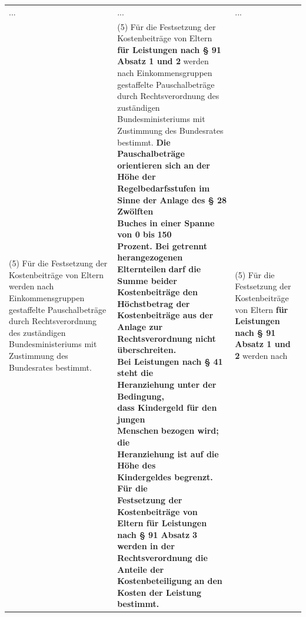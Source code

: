 \documentclass[10pt,a4paper,landscape]{article}
\begin{document}
\begin{longtable}{|L{8.2cm}|L{8.2cm}|L{8.2cm}|}
\hhline{|---|}
... & ... & ... \\
\hhline{|---|}
(5) Für die Festsetzung der Kostenbeiträge  \newline von Eltern werden nach  \newline Einkommensgruppen gestaffelte  \newline Pauschalbeträge durch Rechtsverordnung  \newline des zuständigen Bundesministeriums mit  \newline Zustimmung des Bundesrates bestimmt. & (5) Für die Festsetzung der Kostenbeiträge  \newline von Eltern \textbf{für Leistungen nach \S{} 91  \newline Absatz 1 und 2} werden nach  \newline Einkommensgruppen gestaffelte  \newline Pauschalbeträge durch Rechtsverordnung  \newline des zuständigen Bundesministeriums mit  \newline Zustimmung des Bundesrates bestimmt.  \newline \textbf{\textcolor{diffred}{Die Pauschalbeträge}}\textbf{ orientieren sich an} \newline \textbf{\textcolor{diffred}{der Höhe der}}\textbf{ Regelbedarfsstufen im  \newline Sinne der Anlage des \S{} 28 Zwölften  \newline Buches in einer Spanne von 0 bis }\textbf{\textcolor{diffred}{150  \newline Prozent. Bei getrennt herangezogenen  \newline Elternteilen}}\textbf{ darf die Summe beider  \newline Kostenbeiträge den Höchstbetrag der  \newline Kostenbeiträge aus der Anlage zur  \newline Rechtsverordnung nicht überschreiten.  \newline Bei Leistungen nach \S{} 41 steht die  \newline Heranziehung unter der Bedingung,  \newline dass Kindergeld für den jungen  \newline Menschen }\textbf{\textcolor{diffred}{bezogen wird;}}\textbf{ die  \newline Heranziehung ist auf die Höhe des  \newline Kindergeldes begrenzt. Für die  \newline Festsetzung der Kostenbeiträge von  \newline Eltern für Leistungen nach \S{} 91 Absatz }\textbf{\textcolor{diffred}{3}}\textbf{  \newline werden in der Rechtsverordnung die  \newline Anteile der }\textbf{\textcolor{diffred}{Kostenbeteiligung}}\textbf{ an den  \newline Kosten der Leistung bestimmt.} & (5) Für die Festsetzung der Kostenbeiträge  \newline von Eltern \textbf{für Leistungen nach \S{} 91  \newline Absatz 1 und 2} werden nach  
\end{longtable}
\end{document}
